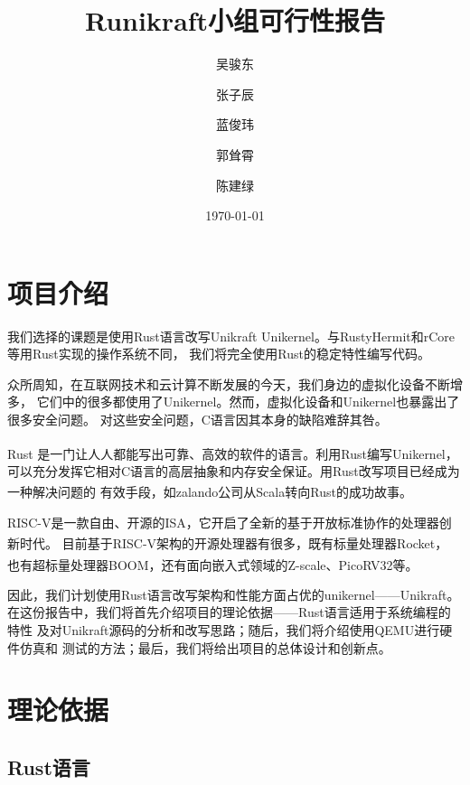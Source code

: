 \documentclass[UTF8,fontset=none,linespread=1.15]{ctexart}
\let\nosupcite\cite
\renewcommand*{\cite}[1]{\textsuperscript{\nosupcite{#1}}}
\begin{document}
\sffamily %
\title{\bfseries Runikraft小组\quad 可行性报告}
\author{吴骏东\and 张子辰\and 蓝俊玮\and 郭耸霄\and 陈建绿}
\date{\today}
\maketitle

\tableofcontents
\section{项目介绍}
我们选择的课题是使用Rust语言改写Unikraft Unikernel。与RustyHermit和rCore等用Rust实现的操作系统不同，
我们将完全使用Rust的稳定特性编写代码。

众所周知，在互联网技术和云计算不断发展的今天，我们身边的虚拟化设备不断增多，
它们中的很多都使用了Unikernel。然而，虚拟化设备和Unikernel也暴露出了很多安全问题。
对这些安全问题，C语言因其本身的缺陷难辞其咎。

Rust 是一门让人人都能写出可靠、高效的软件的语言。\cite{7}利用Rust编写Unikernel，
可以充分发挥它相对C语言的高层抽象和内存安全保证。用Rust改写项目已经成为一种解决问题的
有效手段，如zalando公司从Scala转向Rust的成功故事。\cite{3}

RISC-V是一款自由、开源的ISA，它开启了全新的基于开放标准协作的处理器创新时代。\cite{0}
目前基于RISC-V架构的开源处理器有很多，既有标量处理器Rocket，
也有超标量处理器BOOM，还有面向嵌入式领域的Z-scale、PicoRV32等。\cite{2}

因此，我们计划使用Rust语言改写架构和性能方面占优的unikernel——Unikraft。
在这份报告中，我们将首先介绍项目的理论依据——Rust语言适用于系统编程的特性
及对Unikraft源码的分析和改写思路；随后，我们将介绍使用QEMU进行硬件仿真和
测试的方法；最后，我们将给出项目的总体设计和创新点。
\section{理论依据}
\subsection{Rust语言}
\end{document}

